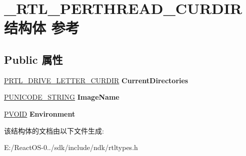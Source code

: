 \hypertarget{struct___r_t_l___p_e_r_t_h_r_e_a_d___c_u_r_d_i_r}{}\section{\+\_\+\+R\+T\+L\+\_\+\+P\+E\+R\+T\+H\+R\+E\+A\+D\+\_\+\+C\+U\+R\+D\+I\+R结构体 参考}
\label{struct___r_t_l___p_e_r_t_h_r_e_a_d___c_u_r_d_i_r}
\subsection*{Public 属性}
\begin{DoxyCompactItemize}
\item 
\mbox{\label{struct___r_t_l___p_e_r_t_h_r_e_a_d___c_u_r_d_i_r_aed36457790ea4fddf0f3579f85d29fc3}} 
\hyperlink{struct___r_t_l___d_r_i_v_e___l_e_t_t_e_r___c_u_r_d_i_r}{P\+R\+T\+L\+\_\+\+D\+R\+I\+V\+E\+\_\+\+L\+E\+T\+T\+E\+R\+\_\+\+C\+U\+R\+D\+IR} {\bfseries Current\+Directories}
\item 
\mbox{\label{struct___r_t_l___p_e_r_t_h_r_e_a_d___c_u_r_d_i_r_add88a76d9fb438feb695dc33aa1fd1fe}} 
\hyperlink{struct___u_n_i_c_o_d_e___s_t_r_i_n_g}{P\+U\+N\+I\+C\+O\+D\+E\+\_\+\+S\+T\+R\+I\+NG} {\bfseries Image\+Name}
\item 
\mbox{\label{struct___r_t_l___p_e_r_t_h_r_e_a_d___c_u_r_d_i_r_a32c107bec45a66956dd96ad34a936216}} 
\hyperlink{interfacevoid}{P\+V\+O\+ID} {\bfseries Environment}
\end{DoxyCompactItemize}


该结构体的文档由以下文件生成\+:\begin{DoxyCompactItemize}
\item 
E\+:/\+React\+O\+S-\/0../sdk/include/ndk/rtltypes.\+h\end{DoxyCompactItemize}
